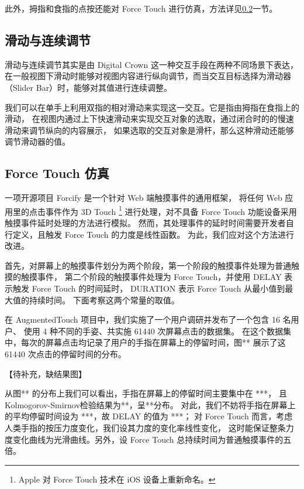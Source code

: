 此外，拇指和食指的点按还能对 Force Touch 进行仿真，方法详见\ref{sub:force-touch-simu}一节。

\subsection{滑动与连续调节}

滑动与连续调节其实是由 Digital Crown 这一种交互手段在两种不同场景下表达，
在一般视图下滑动时能够对视图内容进行纵向调节，而当交互目标选择为滑动器（Slider Bar）时，能够对其值进行连续调整。

我们可以在单手上利用双指的相对滑动来实现这一交互。它是指由拇指在食指上的滑动，
在视图内通过上下快速滑动来实现交互对象的选取，通过闭合时的的慢速滑动来调节纵向的内容展示，
如果选取的交互对象是滑杆，那么这种滑动还能够调节滑动器的值。

\subsection{Force Touch 仿真}
\label{sub:force-touch-simu}

一项开源项目 Forcify \cite{Huxpro:2016ua} 是一个针对 Web 端触摸事件的通用框架，
将任何 Web 应用里的点击事件作为 3D Touch
\footnote{Apple 对 Force Touch 技术在 iOS 设备上重新命名。}
进行处理，对不具备 Force Touch 功能设备采用触摸事件延时处理的方法进行模拟。
然而，其处理事件的延时时间需要开发者自行定义，且触发 Force Touch 的力度是线性函数。
为此，我们应对这个方法进行改进。

首先，对屏幕上的触摸事件划分为两个阶段，第一个阶段的触摸事件处理为普通触摸的触摸事件，
第二个阶段的触摸事件处理为 Force Touch，并使用 DELAY 表示触发 Force Touch 的时间延时，
DURATION 表示 Force Touch 从最小值到最大值的持续时间。
下面考察这两个常量的取值。

在 AugmentedTouch \cite{Changkun:2016} 项目中，我们实施了一个用户调研并发布了一个包含 16 名用户、
使用 4 种不同的手姿、共实施 61440 次屏幕点击的数据集。
在这个数据集中，每次的屏幕点击均记录了用户的手指在屏幕上的停留时间，图** 展示了这 61440 次点击的停留时间的分布。

【待补充，缺结果图】

从图** 的分布上我们可以看出，手指在屏幕上的停留时间主要集中在 ***，
且Kolmogorov-Smirnov检验结果为**，呈**分布。
对此，我们不妨将手指在屏幕上的平均停留时间设为 ***，故 DELAY 的值为 ***；
对 Force Touch 而言，考虑人类手指的按压力度变化，我们设其力度的变化率线性变化，
这时能保证整条力度变化曲线为光滑曲线。另外，设 Force Touch 总持续时间为普通触摸事件的五倍。

